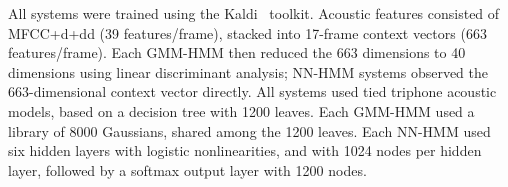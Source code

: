 {\color{blue} All systems were trained using the
  Kaldi~\cite{Kaldi2011} toolkit.  Acoustic features consisted of
  MFCC+d+dd (39 features/frame), stacked into 17-frame context vectors
  (663 features/frame).  Each GMM-HMM then reduced the
  663 dimensions to 40 dimensions using
  linear discriminant analysis; NN-HMM systems observed the
  663-dimensional context vector directly.  All systems used tied
  triphone acoustic models, based on a decision tree with 1200 leaves.
  Each GMM-HMM used a library of 8000 Gaussians, shared among the 1200
  leaves.  Each NN-HMM used six hidden layers with logistic
  nonlinearities, and with 1024 nodes per hidden layer, followed by a
  softmax output layer with 1200 nodes.}
  




